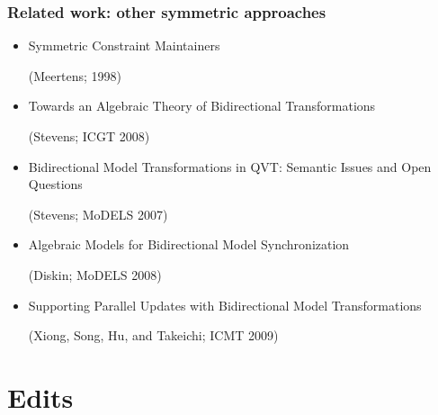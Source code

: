 \documentclass[14pt]{beamer}
\begin{document}
\begin{frame}
    \frametitle{Related work: other symmetric approaches}
    \begin{itemize}
        \small
        \item Symmetric Constraint Maintainers

            \quad (Meertens; 1998)
        \item Towards an Algebraic Theory of Bidirectional Transformations

            \quad (Stevens; ICGT 2008)
        \item Bidirectional Model Transformations in QVT: Semantic Issues
            and Open Questions

            \quad (Stevens; MoDELS 2007)
        \item Algebraic Models for Bidirectional Model Synchronization

            \quad (Diskin; MoDELS 2008)

        \item Supporting Parallel Updates with Bidirectional Model
            Transformations

            \quad (Xiong, Song, Hu, and Takeichi; ICMT 2009)
    \end{itemize}
\end{frame}

\section{Edits}
\begin{frame}
    \begin{center}
    \end{center}
\end{frame}
\end{document}
